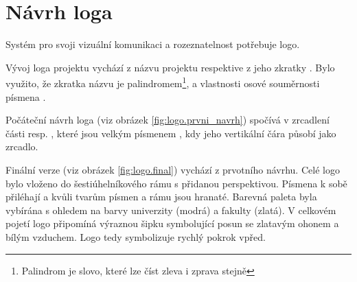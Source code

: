 \documentclass[czech,BP]{thesiskiv}
\begin{document}
	\section{Návrh loga}
	\par Systém pro svoji vizuální komunikaci a rozeznatelnost potřebuje logo. 
	\par Vývoj loga projektu vychází z názvu projektu  respektive z jeho zkratky . Bylo využito, že zkratka názvu je palindromem\footnote{Palindrom je slovo, které lze číst zleva i zprava stejně}, a vlastnosti osové souměrnosti písmena .
	\par Počáteční návrh loga (viz obrázek \ref{fig:logo.prvni_navrh}) spočívá v zrcadlení části  resp. , které jsou  velkým písmenem , kdy jeho vertikální čára působí jako zrcadlo.
	\par Finální verze (viz obrázek \ref{fig:logo.final}) vychází z prvotního návrhu. Celé logo bylo vloženo do šestiúhelníkového rámu s přidanou perspektivou. Písmena k sobě přiléhají a kvůli tvarům písmen a rámu jsou hranaté. Barevná paleta byla vybírána s ohledem na barvy univerzity (modrá) a fakulty (zlatá). V celkovém pojetí logo připomíná výraznou šipku symbolující posun se zlatavým ohonem a bílým vzduchem. Logo tedy symbolizuje rychlý pokrok vpřed.
\end{document}
